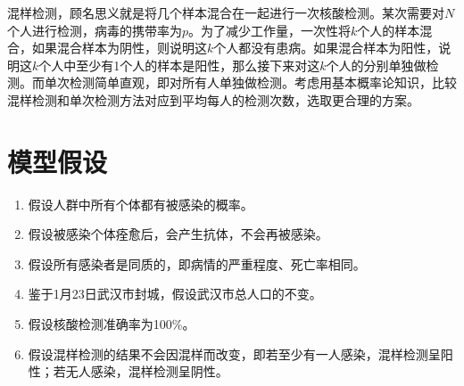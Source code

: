 \documentclass[withoutpre]{cumcmthesis} %
\begin{document}
混样检测，顾名思义就是将几个样本混合在一起进行一次核酸检测。某次需要对$N$个人进行检测，病毒的携带率为$p$。为了减少工作量，一次性将$k$个人的样本混合，如果混合样本为阴性，则说明这$k$个人都没有患病。如果混合样本为阳性，说明这$k$个人中至少有1个人的样本是阳性，那么接下来对这$k$个人的分别单独做检测。而单次检测简单直观，即对所有人单独做检测。考虑用基本概率论知识，比较混样检测和单次检测方法对应到平均每人的检测次数，选取更合理的方案。

\section{模型假设}
\begin{enumerate}
    \item 假设人群中所有个体都有被感染的概率。
    \item 假设被感染个体痊愈后，会产生抗体，不会再被感染。
    \item 假设所有感染者是同质的，即病情的严重程度、死亡率相同。
    \item 鉴于1月23日武汉市封城，假设武汉市总人口的不变。
    \item 假设核酸检测准确率为100\%。
    \item 假设混样检测的结果不会因混样而改变，即若至少有一人感染，混样检测呈阳性；若无人感染，混样检测呈阴性。
\end{enumerate}
\end{document}
